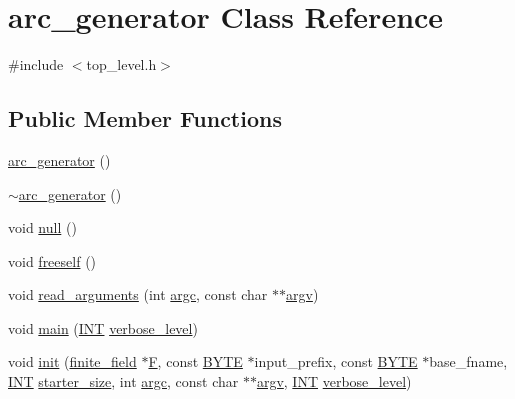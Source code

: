 \hypertarget{classarc__generator}{}\section{arc\+\_\+generator Class Reference}
\label{classarc__generator}


{\ttfamily \#include $<$top\+\_\+level.\+h$>$}

\subsection*{Public Member Functions}
\begin{DoxyCompactItemize}
\item 
\mbox{\hyperlink{classarc__generator_a3dddba31da36ee407ac37cf3329375b1}{arc\+\_\+generator}} ()
\item 
\mbox{\hyperlink{classarc__generator_a4e807cda927463cb8dd096ffaa7bc307}{$\sim$arc\+\_\+generator}} ()
\item 
void \mbox{\hyperlink{classarc__generator_a0e89a29e9434bb47114cf02d7a5cb0a3}{null}} ()
\item 
void \mbox{\hyperlink{classarc__generator_aa46fc8a0cfb3f92b306b1f6825d0f1a0}{freeself}} ()
\item 
void \mbox{\hyperlink{classarc__generator_a40f6314a4dc00fdfaf5eea75a23edfc1}{read\+\_\+arguments}} (int \mbox{\hyperlink{classarc__generator_a259ae1391f0b81ade1c0786166a794aa}{argc}}, const char $\ast$$\ast$\mbox{\hyperlink{classarc__generator_aff62e9c019a7428f31ca5855f3d9213b}{argv}})
\item 
void \mbox{\hyperlink{classarc__generator_ad80140b51b165dad1fe6ab232be7829a}{main}} (\mbox{\hyperlink{galois_8h_a09fddde158a3a20bd2dcadb609de11dc}{I\+NT}} \mbox{\hyperlink{classarc__generator_a38cb55f50fe5c7965368f1ff8ea8b017}{verbose\+\_\+level}})
\item 
void \mbox{\hyperlink{classarc__generator_ae614e18e9c641d67069fa27d48245cde}{init}} (\mbox{\hyperlink{classfinite__field}{finite\+\_\+field}} $\ast$\mbox{\hyperlink{classarc__generator_a7336d436d54e462d2ce822a518f05195}{F}}, const \mbox{\hyperlink{galois_8h_ab6cc7b4aeb6ea31aba2b3fbfc83ff5e6}{B\+Y\+TE}} $\ast$input\+\_\+prefix, const \mbox{\hyperlink{galois_8h_ab6cc7b4aeb6ea31aba2b3fbfc83ff5e6}{B\+Y\+TE}} $\ast$base\+\_\+fname, \mbox{\hyperlink{galois_8h_a09fddde158a3a20bd2dcadb609de11dc}{I\+NT}} \mbox{\hyperlink{classarc__generator_a8eeee79ece398f5e502940de3e8ae25a}{starter\+\_\+size}}, int \mbox{\hyperlink{classarc__generator_a259ae1391f0b81ade1c0786166a794aa}{argc}}, const char $\ast$$\ast$\mbox{\hyperlink{classarc__generator_aff62e9c019a7428f31ca5855f3d9213b}{argv}}, \mbox{\hyperlink{galois_8h_a09fddde158a3a20bd2dcadb609de11dc}{I\+NT}} \mbox{\hyperlink{classarc__generator_a38cb55f50fe5c7965368f1ff8ea8b017}{verbose\+\_\+level}})

\end{DoxyCompactItemize}
